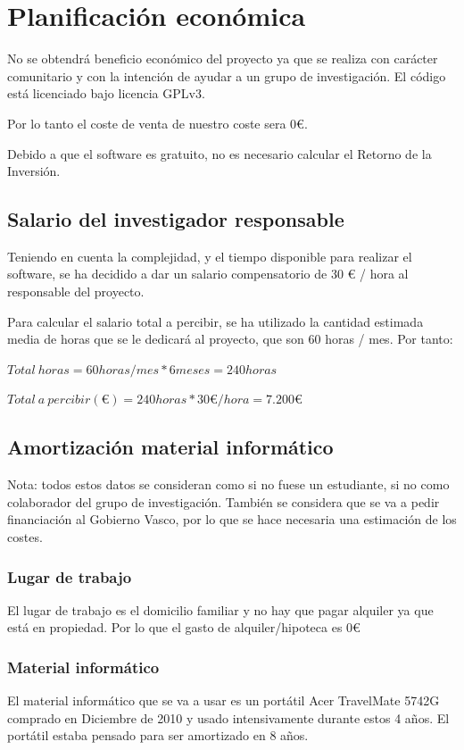 \section{Planificaci\'{o}n econ\'{o}mica}
No se obtendr\'{a} beneficio econ\'{o}mico del proyecto ya que se realiza con car\'acter comunitario y con la intenci\'on
de ayudar a un grupo de investigaci\'on. El c\'odigo est\'a licenciado bajo licencia GPLv3.

Por lo tanto el coste de venta de nuestro coste sera 0€.

Debido a que el software es gratuito, no es necesario calcular el Retorno de la Inversi\'on.

\subsection{Salario del investigador responsable}
Teniendo en cuenta la complejidad, y el tiempo disponible para realizar el software, se ha
decidido a dar un salario compensatorio de 30 € / hora al responsable del proyecto.

Para calcular el salario total a percibir, se ha utilizado la cantidad estimada media de horas
que se le dedicar\'a al proyecto, que son 60 horas / mes.
Por tanto:

\begin{center}
	$ Total \ horas = 60 horas / mes * 6 meses = 240 horas $
	
	$ Total \ a \ percibir (€) = 240 horas * 30 € / hora = 7.200 € $
\end{center}

\subsection{Amortizaci\'on material inform\'atico}
Nota: todos estos datos se consideran como si no fuese un estudiante, si no como colaborador
del grupo de investigaci\'on. Tambi\'en se considera que se va a pedir financiaci\'on al
Gobierno Vasco, por lo que se hace necesaria una estimaci\'on de los costes.

\subsubsection{Lugar de trabajo}
El lugar de trabajo es el domicilio familiar y no hay que pagar alquiler ya que est\'a en
propiedad. Por lo que el gasto de alquiler/hipoteca es 0€
\subsubsection{Material inform\'{a}tico}
El material informático que se va a usar es un portátil Acer TravelMate 5742G comprado en 
Diciembre de 2010 y usado intensivamente durante estos 4 años. 
El portátil estaba pensado para ser amortizado en 8 años.

